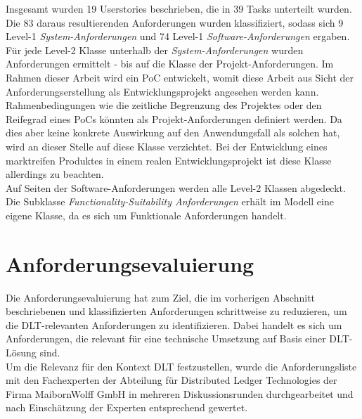Insgesamt wurden 19 Userstories beschrieben, die in 39 Tasks unterteilt wurden. Die 83 daraus resultierenden Anforderungen wurden klassifiziert, sodass sich 9 Level-1 \textit{System-Anforderungen} und 74 Level-1 \textit{Software-Anforderungen} ergaben. Für jede Level-2 Klasse unterhalb der \textit{System-Anforderungen} wurden Anforderungen ermittelt - bis auf die Klasse der Projekt-Anforderungen. Im Rahmen dieser Arbeit wird ein \ac{PoC} entwickelt, womit diese Arbeit aus Sicht der Anforderungserstellung als Entwicklungsprojekt angesehen werden kann. Rahmenbedingungen wie die zeitliche Begrenzung des Projektes oder den Reifegrad eines \acp{PoC} könnten als Projekt-Anforderungen definiert werden. Da dies aber keine konkrete Auswirkung auf den Anwendungsfall als solchen hat, wird an dieser Stelle auf diese Klasse verzichtet. Bei der Entwicklung eines marktreifen Produktes in einem realen Entwicklungsprojekt ist diese Klasse allerdings zu beachten.\\
Auf Seiten der Software-Anforderungen werden alle Level-2 Klassen abgedeckt. Die Subklasse \textit{Functionality-Suitability Anforderungen} erhält im Modell eine eigene Klasse, da es sich um Funktionale Anforderungen handelt.

%
%
\section{Anforderungsevaluierung}
\label{sec:requirements:evaluation}
Die Anforderungsevaluierung hat zum Ziel, die im vorherigen Abschnitt beschriebenen und klassifizierten Anforderungen schrittweise zu reduzieren, um die \ac{DLT}-relevanten Anforderungen zu identifizieren. Dabei handelt es sich um Anforderungen, die relevant für eine technische Umsetzung auf Basis einer \ac{DLT}-Lösung sind.\\
Um die Relevanz für den Kontext \ac{DLT} festzustellen, wurde die Anforderungsliste mit den Fachexperten der Abteilung für Distributed Ledger Technologies der Firma MaibornWolff GmbH in mehreren Diskussionsrunden durchgearbeitet und nach Einschätzung der Experten entsprechend gewertet.


